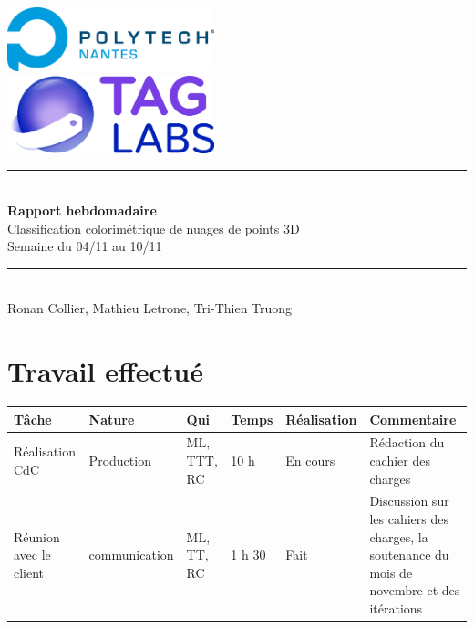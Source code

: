 \documentclass[12pt,titlepage,french]{article}
\begin{document}

\begin{titlepage}
\newcommand{\HRule}{\rule{\linewidth}{0.5mm}}
\center

  \includegraphics[width=0.45\textwidth]{../ressources/img_logos/logo_polytech.png}\\[1cm]
   
  \includegraphics[width=0.45\textwidth]{../ressources/img_logos/logo_taglabs.png}


\HRule \\[0.4cm]
{ \huge \bfseries Rapport hebdomadaire\\[0.15cm] }
Classification colorimétrique de nuages de points 3D\\
Semaine du 04/11 au 10/11
\HRule \\[1.5cm]
Ronan Collier,
Mathieu Letrone,
Tri-Thien Truong
\\[1cm]
\end{titlepage}

\section{Travail effectué}

\noindent\begin{tabularx}{17cm}{|p{2.5cm}|p{2.5cm}|p{1cm}|p{1.5cm}|p{2.5cm}|X|}
    \hline
    \textbf{Tâche} & \textbf{Nature} & \textbf{Qui} & \textbf{Temps} & \textbf{Réalisation} & \textbf{Commentaire} \\
    \hline
    Réalisation CdC & Production & ML, TTT, RC & 10 h & En cours &  Rédaction du cachier des charges\\
    \hline
    Réunion avec le client & communication & ML, TT, RC & 1 h 30 & Fait & Discussion sur les cahiers des charges, la soutenance du mois de novembre et des itérations\\
    \hline
\end{tabularx}
\end{document}
